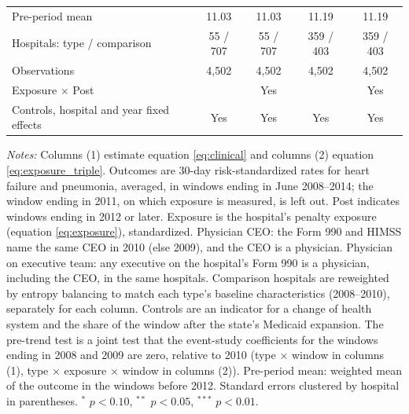 \begin{table}
\begin{threeparttable}
\begin{tabular}[t]{lcccc}
\hspace{1em}Pre-period mean & 11.03 & 11.03 & 11.19 & 11.19\\
\hspace{1em}Hospitals: type / comparison & 55 / 707 & 55 / 707 & 359 / 403 & 359 / 403\\
\hspace{1em}Observations & 4,502 & 4,502 & 4,502 & 4,502\\
\midrule
Exposure $\times$ Post &  & Yes &  & Yes\\
Controls, hospital and year fixed effects & Yes & Yes & Yes & Yes\\
\bottomrule
\end{tabular}
\begin{tablenotes}[flushleft]
\footnotesize
\item \textit{Notes:} Columns (1) estimate equation \eqref{eq:clinical} and columns (2) equation \eqref{eq:exposure_triple}. Outcomes are 30-day risk-standardized rates for heart failure and pneumonia, averaged, in windows ending in June 2008--2014; the window ending in 2011, on which exposure is measured, is left out. Post indicates windows ending in 2012 or later. Exposure is the hospital's penalty exposure (equation \eqref{eq:exposure}), standardized. Physician CEO: the Form 990 and HIMSS name the same CEO in 2010 (else 2009), and the CEO is a physician. Physician on executive team: any executive on the hospital's Form 990 is a physician, including the CEO, in the same hospitals. Comparison hospitals are reweighted by entropy balancing to match each type's baseline characteristics (2008--2010), separately for each column. Controls are an indicator for a change of health system and the share of the window after the state's Medicaid expansion. The pre-trend test is a joint test that the event-study coefficients for the windows ending in 2008 and 2009 are zero, relative to 2010 (type $\times$ window in columns (1), type $\times$ exposure $\times$ window in columns (2)). Pre-period mean: weighted mean of the outcome in the windows before 2012. Standard errors clustered by hospital in parentheses. $^{*}$ $p<0.10$, $^{**}$ $p<0.05$, $^{***}$ $p<0.01$.
\end{tablenotes}
\end{threeparttable}
\end{table}
